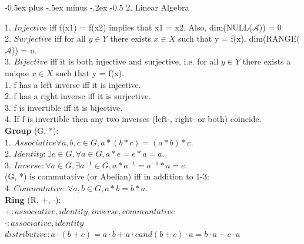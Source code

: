 \documentclass[10pt,landscape]{article}
\makeatletter
\renewcommand{\section}{\@startsection{section}{1}{0mm}%
                                {-0.5ex plus -.5ex minus -.2ex}%
                                {-0.5\baselineskip}%
                                {\normalfont\small\bfseries}}
\makeatother
\begin{document}
\raggedright

\scriptsize

\begin{multicols*}{4}

\setlength{\columnseprule}{0.25pt}
\setlength{\premulticols}{0.25pt}
\setlength{\postmulticols}{0.25pt}
\setlength{\multicolsep}{0.25pt}
\setlength{\columnsep}{0.25pt}

\section{2. Linear Algebra}

1. $Injective$ iff f(x1) = f(x2) implies that x1 = x2. Also, dim(NULL($\mathcal{A}$)) = 0\\
2. $Surjective$ iff for all $y \in Y$ there exists $x \in X$ such that y = f(x). dim(RANGE($\mathcal{A}$)) = n.\\
3. $Bijective$ iff it is both injective and surjective, i.e. for all $y \in Y$ there exists a unique $x \in X$ such that y = f(x).\\

1. f has a left inverse iff it is injective.\\
2. f has a right inverse iff it is surjective.\\
3. f is invertible iff it is bijective.\\
4. If f is invertible then any two inverses (left-, right- or both) coincide.\\

\textbf{Group} (G, *):\\
1. $Associative \forall a, b, c \in G, a * (b * c) = (a * b) * c$.\\
2. $Identity: \exists e \in G, \forall a \in G, a * e = e * a = a.$\\
3. $Inverse: \forall a \in G, \exists a^{-1} \in G, a * a ^{-1} = a^{-1} * a = e.$\\
(G, *) is commutative (or Abelian) iff in addition to 1-3:\\
4. $Commutative: \forall a, b \in G, a * b = b * a.$\\

\textbf{Ring} (R, +, $\cdot$):\\
$+: associative, identity, inverse, communtative$\\
$\cdot : associative, identity$\\
$distributive: a \cdot (b+c) = a \cdot b + a \cdot c and (b + c) \cdot a = b \cdot a + c \cdot a$\\


\end{multicols*}
\end{document}
